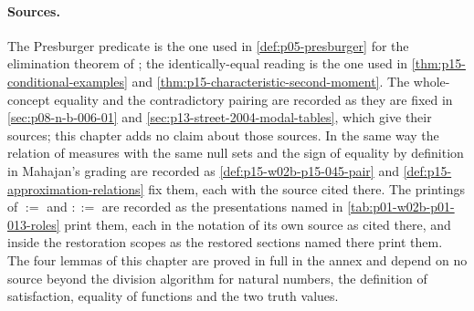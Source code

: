 \paragraph{Sources.}  The Presburger predicate is the one used in
\cref{def:p05-presburger} for the elimination theorem of
\cite{Presburger1929}; the identically-equal reading is the one used in
\cref{thm:p15-conditional-examples} and
\cref{thm:p15-characteristic-second-moment}.  The whole-concept equality
and the contradictory pairing are recorded as they are fixed in
\cref{sec:p08-n-b-006-01} and \cref{sec:p13-street-2004-modal-tables}, which
give their sources; this chapter adds no claim about those sources.  In
the same way the relation of measures with the same null sets and the sign
of equality by definition in Mahajan's grading are recorded as
\cref{def:p15-w02b-p15-045-pair} and \cref{def:p15-approximation-relations}
fix them, each with the source cited there.  The
printings of \(:=\) and \(::=\) are recorded as the presentations named in
\cref{tab:p01-w02b-p01-013-roles} print them, each in the notation of its
own source as cited there, and inside the restoration scopes as the
restored sections named there print them.  The four lemmas of this chapter are proved in
full in the annex and depend on no source beyond the division algorithm
for natural numbers, the definition of satisfaction, equality of functions
and the two truth values.
